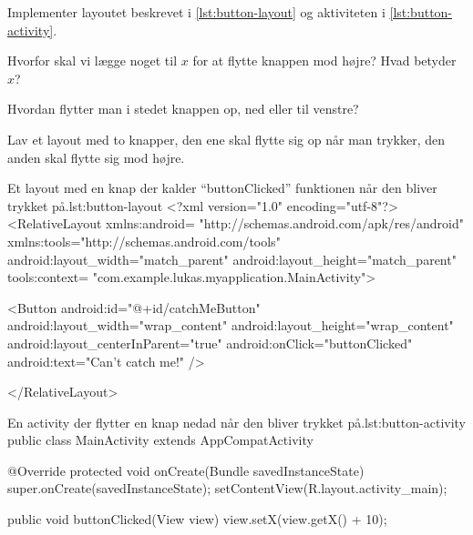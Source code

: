 \begin{exercise}
	Implementer layoutet beskrevet i \autoref{lst:button-layout} og aktiviteten 
	i \autoref{lst:button-activity}.
\end{exercise}

\begin{exercise}
	Hvorfor skal vi lægge noget til $x$ for at flytte knappen mod højre? Hvad 
	betyder $x$?
\end{exercise}

\begin{exercise}
	Hvordan flytter man i stedet knappen op, ned eller til venstre?
\end{exercise}

\begin{exercise}
	Lav et layout med to knapper, den ene skal flytte sig op når man trykker, 
	den anden skal flytte sig mod højre.
\end{exercise}

\clearpage


\begin{XmlCode}{Et layout med en knap der kalder ``buttonClicked'' funktionen %
når den bliver trykket på.}{lst:button-layout}
	<?xml version="1.0" encoding="utf-8"?>
	<RelativeLayout 
		xmlns:android=
			"http://schemas.android.com/apk/res/android"
		xmlns:tools="http://schemas.android.com/tools"
		android:layout_width="match_parent"
		android:layout_height="match_parent"
		tools:context=
			"com.example.lukas.myapplication.MainActivity">
	
	<Button
		android:id="@+id/catchMeButton"
		android:layout_width="wrap_content"
		android:layout_height="wrap_content"
		android:layout_centerInParent="true"
		android:onClick="buttonClicked"
		android:text="Can't catch me!" />
		
	</RelativeLayout>
\end{XmlCode}

\clearpage

\begin{JavaCode}{En activity der flytter en knap nedad når den bliver trykket %
på.}{lst:button-activity}
	public class MainActivity extends AppCompatActivity {
		
		@Override
		protected void onCreate(Bundle savedInstanceState) {
			super.onCreate(savedInstanceState);
			setContentView(R.layout.activity_main);
		}
		
		
		public void buttonClicked(View view) {
			view.setX(view.getX() + 10);
		}
	}
\end{JavaCode}



